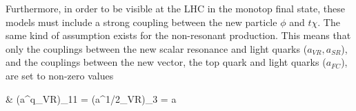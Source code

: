 Furthermore, in order to be visible at the LHC in the monotop final state, 
these models must include a strong coupling between the new particle $\phi$ and $t\chi$.
The same kind of assumption exists for the non-resonant production. 
This means that only the couplings between the new scalar resonance and  
light quarks ($a_{VR}, a_{SR}$), and the couplings between the new vector, the top quark 
and light quarks ($a_{FC}$), are set to non-zero values 

\be\label{eq:a}\bsp
& (a^q_{VR})_{11} = (a^{1/2}_{VR})_3 = a
\esp 
\ee

 
%




